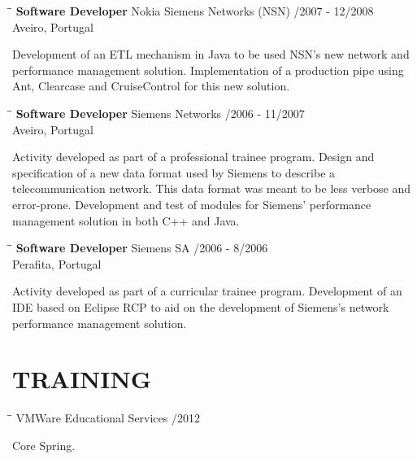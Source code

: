 \documentclass{res}
\begin{document}
\begin{resume}
\begin{tabbing}
\hspace{2.3in}\= \hspace{2.6in}\= \kill %
{\bf Software Developer} \>Nokia Siemens Networks (NSN)    
/2007 - 12/2008\\ \>Aveiro, Portugal
\end{tabbing}\vspace{-20pt}      %
Development of an ETL mechanism in Java to be used NSN's new network and
performance management solution. Implementation of a production pipe using Ant,
Clearcase and CruiseControl for this new solution.

\begin{tabbing}
\hspace{2.3in}\= \hspace{2.6in}\= \kill %
{\bf Software Developer} \>Siemens Networks    
/2006 - 11/2007\\ \>Aveiro, Portugal
\end{tabbing}\vspace{-20pt}      %
Activity developed as part of a professional trainee program.
Design and specification of a new data format used by Siemens to describe a
telecommunication network. This data format was meant to be less verbose and
error-prone. Development and test of modules for Siemens' performance
management solution in both C++ and Java.

\begin{tabbing}
\hspace{2.3in}\= \hspace{2.6in}\= \kill %
{\bf Software Developer} \>Siemens SA    
/2006 - 8/2006\\ \>Perafita, Portugal
\end{tabbing}\vspace{-20pt}      %
Activity developed as part of a curricular trainee program.
Development of an IDE based on Eclipse RCP to aid on the development of
Siemens’s network performance management solution.

\section{TRAINING}

\begin{tabbing}
\hspace{2.3in}\= \hspace{2.6in}\= \kill %
{\bf } \>VMWare Educational Services    
/2012\\ \>
\end{tabbing}\vspace{-20pt}
Core Spring.


\end{resume}
\end{document}
